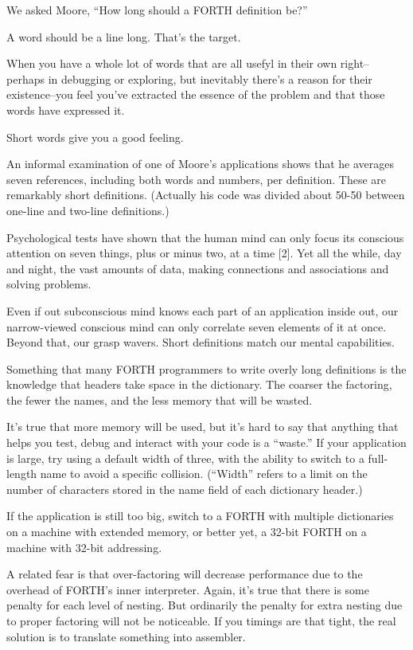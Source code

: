 \bigskip
\blackline{2ex}
\noindent We asked Moore, ``How long should a FORTH definition be?''

\begin{tfquot}
A word should be a line long. That's the target.

When you have a whole lot of words that are all usefyl in their own right--perhaps in debugging or exploring, but inevitably there's a reason for their existence--you feel you've extracted the essence of the problem and that those words have expressed it.

Short words give you a good feeling.
\end{tfquot}
\blackline{1ex}

An informal examination of one of Moore's applications shows that he averages seven references, including both words and numbers, per definition. These are remarkably short definitions. (Actually his code was divided about 50-50 between one-line and two-line definitions.)

Psychological tests have shown that the human mind can only focus its conscious attention on seven things, plus or minus two, at a time [2]. Yet all the while, day and night, the vast amounts of data, making connections and associations and solving problems.

Even if out subconscious mind knows each part of an application inside out, our narrow-viewed conscious mind can only correlate seven elements of it at once. Beyond that, our grasp wavers. Short definitions match our mental capabilities.

Something that many FORTH programmers to write overly long definitions is the knowledge that headers take space in the dictionary. The coarser the factoring, the fewer the names, and the less memory that will be wasted.

It's true that more memory will be used, but it's hard to say that anything that helps you test, debug and interact with your code is a ``waste.'' If your application is large, try using a default width of three, with the ability to switch to a full-length name to avoid a specific collision. (``Width'' refers to a limit on the number of characters stored in the name field of each dictionary header.)

If the application is still too big, switch to a FORTH with multiple dictionaries on a machine with extended memory, or better yet, a 32-bit FORTH on a machine with 32-bit addressing.

A related fear is that over-factoring will decrease performance due to the overhead of FORTH's inner interpreter. Again, it's true that there is some penalty for each level of nesting. But ordinarily the penalty for extra nesting due to proper factoring will not be noticeable. If you timings are that tight, the real solution is to translate something into assembler.

